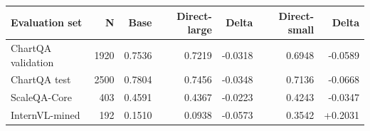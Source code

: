 \begin{tabular}{lrrrrrr}
\toprule
Evaluation set & N & Base & Direct-large & Delta & Direct-small & Delta \\
\midrule
ChartQA validation & 1920 & 0.7536 & 0.7219 & -0.0318 & 0.6948 & -0.0589 \\
ChartQA test & 2500 & 0.7804 & 0.7456 & -0.0348 & 0.7136 & -0.0668 \\
ScaleQA-Core & 403 & 0.4591 & 0.4367 & -0.0223 & 0.4243 & -0.0347 \\
InternVL-mined & 192 & 0.1510 & 0.0938 & -0.0573 & 0.3542 & +0.2031 \\
\bottomrule
\end{tabular}
